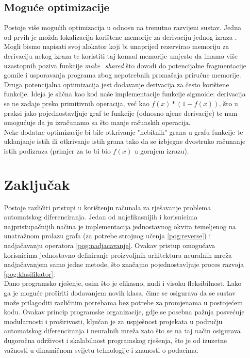 \documentclass[zavrsnirad]{fer}
\begin{document}
\section{Moguće optimizacije}
Postoje više mogućih optimizacija u odnosu na trenutno razvijeni sustav. Jedna od prvih je možda lokalizacija korištene memorije za derivaciju jednog izraza \cite{margossian2019review}. Mogli bismo napisati svoj alokator koji bi unaprijed rezervirao memoriju za derivaciju nekog izraza te koristiti taj komad memorije umjesto da imamo više uzastopnih poziva funkcije \textit{make\_shared} što dovodi do potencijalne fragmentacije gomile i usporavanja programa zbog nepotrebnih promašaja priručne memorije.
\\
Druga potencijalna optimizacija jest dodavanje derivacija za često korištene funkcije. Ideja je slična kao kod naše implementacije funkcije sigmoide: derivacija se ne zadaje preko primitivnih operacija, već kao $f(x) * (1 - f(x))$, što u praksi jako pojednostavljuje graf te funkcije (odnosno njene derivacije) te nam omogućuje da ju izračunamo sa što manje računskih operacija.
\\
Neke dodatne optimizacije bi bile otkrivanje "nebitnih" grana u grafu funkcije te uklanjanje istih ili otkrivanje istih grana tako da se izbjegne dvostruko računanje istih podizraza (primjer za to bi bio $f(x)$ u gornjem izrazu).

\chapter{Zaključak}
\label{pog:zakljucak}

Postoje različiti pristupi u korištenju računala za rješavanje problema automatskog diferenciranja. Jedan od najefikasnijih i korisnicima najpristupačnijih načina je implementacija jednostavnog okvira temeljenog na unatražnom prolazu grafa (za potrebe strojnog učenja \ref{pog:reverse}) i nadjačavanju operatora \ref{pog:nadjacavanje}. Ovakav pristup omogućava korisnicima jednostavno definiranje proizvoljnih arhitektura neuralnih mreža nadjačavanjem samo jedne metode, što značajno pojednostavljuje proces razvoja \ref{pog:klasifikator}.
\\
Dano programsko rješenje, osim što je efikasno, nudi i visoku fleksibilnost. Lako ga je moguće proširiti dodavanjem novih klasa, čime se osigurava da se sustav može prilagoditi različitim potrebama bez potrebe za promjenama u postojećem kodu. Ovakav princip programske organizacije, gdje se posebna pažnja posvećuje modularnosti i proširivosti, ključan je za uspješnost projekata u području automatskog diferenciranja i neuralnih mreža zato što se na taj način osigurava dugoročna održivost i skalabilnost programskog rješenja, što je od izuzetne važnosti u dinamičnom svijetu tehnologije i znanosti o podacima.
\\
\end{document}
